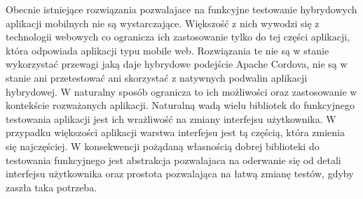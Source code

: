 \documentclass[brudnopis]{xmgr}
\begin{document}
Obecnie istniejące rozwiązania pozwalajace na funkcyjne testowanie hybrydowych aplikacji mobilnych nie są wystarczające. Większość z nich wywodzi się z technologii webowych co ogranicza ich zastosowanie tylko do tej części aplikacji, która odpowiada aplikacji typu mobile web. Rozwiązania te nie są w stanie wykorzystać przewagi jaką daje hybrydowe podejście Apache Cordova, nie są w stanie ani przetestować ani skorzystać z natywnych podwalin aplikacji hybrydowej. W naturalny sposób ogranicza to ich możliwości oraz zastosowanie w kontekście rozważanych aplikacji. Naturalną wadą wielu bibliotek do funkcyjnego testowania aplikacji jest ich wrażliwość na zmiany interfejsu użytkownika. W przypadku większości aplikacji warstwa interfejsu jest tą częścią, która zmienia się najczęściej. W konsekwencji pożądaną własnością dobrej biblioteki do testowania funkcyjnego jest abstrakcja pozwalajaca na oderwanie się od detali interfejsu użytkownika oraz prostota pozwalająca na łatwą zmianę testów, gdyby zaszła taka potrzeba. 
\end{document}
